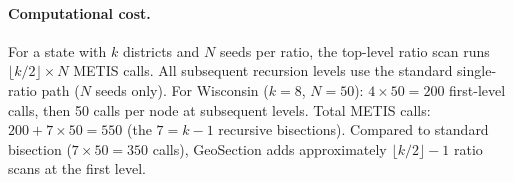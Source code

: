\paragraph{Computational cost.}
For a state with $k$ districts and $N$ seeds per ratio, the top-level ratio
scan runs $\lfloor k/2 \rfloor \times N$ METIS calls.
All subsequent recursion levels use the standard single-ratio path ($N$ seeds only).
For Wisconsin ($k=8$, $N=50$): $4 \times 50 = 200$ first-level calls,
then 50 calls per node at subsequent levels.
Total METIS calls: $200 + 7 \times 50 = 550$ (the $7 = k - 1$ recursive bisections).
Compared to standard bisection ($7 \times 50 = 350$ calls), GeoSection
adds approximately $\lfloor k/2 \rfloor - 1$ ratio scans at the first level.
